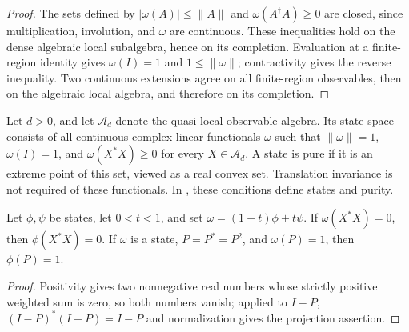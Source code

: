 \begin{proof}
    \leanok
    The sets defined by $|\omega(A)|\leq\lVert A\rVert$ and
    $\omega(A^\dagger A)\geq0$ are closed, since multiplication, involution,
    and $\omega$ are continuous. These inequalities hold on the dense
    algebraic local subalgebra, hence on its completion. Evaluation at a
    finite-region identity gives $\omega(I)=1$ and
    $1\leq\lVert\omega\rVert$; contractivity gives the reverse inequality.
    Two continuous extensions agree on all finite-region observables,
    then on the algebraic local algebra, and therefore on its completion.
\end{proof}

\begin{definition}
    \label{def:qca_state_space_purity}
    \leanok
    Let $d>0$, and let $\mathcal A_d$ denote the quasi-local observable algebra.
    Its state space consists of all continuous complex-linear functionals
    $\omega$ such that $\|\omega\|=1$, $\omega(I)=1$, and
    $\omega(X^*X)\ge0$ for every $X\in\mathcal A_d$.
    A state is pure if it is an extreme point of this set, viewed as a real
    convex set. Translation invariance is not required of these functionals.
    In \cite[Section~1 and Section~3]{Nachtergaele1996Spectral}, these conditions define states and
    purity.
\end{definition}

\begin{lemma}
    \label{thm:qca_state_convex_support}
    \leanok
    Let $\phi,\psi$ be states, let $0<t<1$, and set
    $\omega=(1-t)\phi+t\psi$.
    If $\omega(X^*X)=0$, then $\phi(X^*X)=0$.
    If $\omega$ is a state, $P=P^*=P^2$, and $\omega(P)=1$, then
    $\phi(P)=1$.
\end{lemma}
\begin{proof}
    \leanok
    Positivity gives two nonnegative real numbers whose strictly positive
    weighted sum is zero, so both numbers vanish; applied to $I-P$,
    $(I-P)^*(I-P)=I-P$ and normalization gives the projection assertion.
\end{proof}

